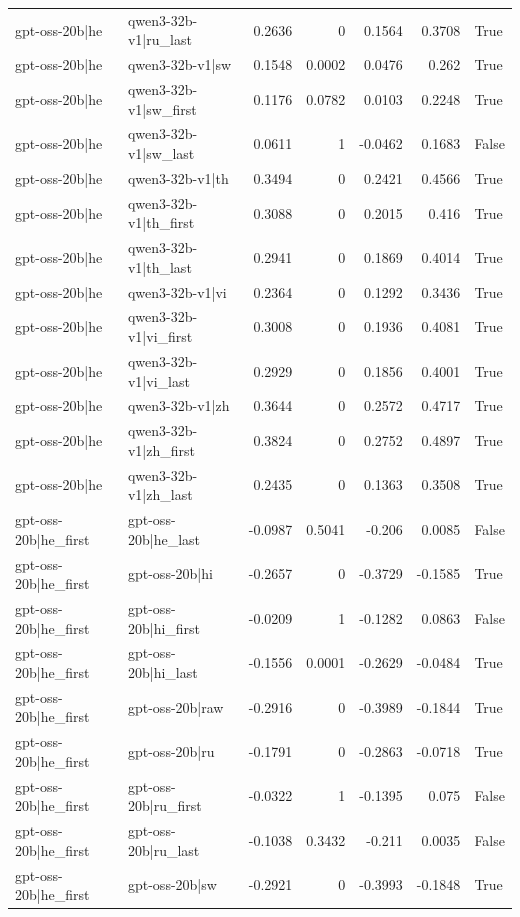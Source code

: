 \begin{table}
\begin{tabular}{l l r r r r l}
gpt-oss-20b|he & qwen3-32b-v1|ru_last & 0.2636 & 0 & 0.1564 & 0.3708 & True \\
gpt-oss-20b|he & qwen3-32b-v1|sw & 0.1548 & 0.0002 & 0.0476 & 0.262 & True \\
gpt-oss-20b|he & qwen3-32b-v1|sw_first & 0.1176 & 0.0782 & 0.0103 & 0.2248 & True \\
gpt-oss-20b|he & qwen3-32b-v1|sw_last & 0.0611 & 1 & -0.0462 & 0.1683 & False \\
gpt-oss-20b|he & qwen3-32b-v1|th & 0.3494 & 0 & 0.2421 & 0.4566 & True \\
gpt-oss-20b|he & qwen3-32b-v1|th_first & 0.3088 & 0 & 0.2015 & 0.416 & True \\
gpt-oss-20b|he & qwen3-32b-v1|th_last & 0.2941 & 0 & 0.1869 & 0.4014 & True \\
gpt-oss-20b|he & qwen3-32b-v1|vi & 0.2364 & 0 & 0.1292 & 0.3436 & True \\
gpt-oss-20b|he & qwen3-32b-v1|vi_first & 0.3008 & 0 & 0.1936 & 0.4081 & True \\
gpt-oss-20b|he & qwen3-32b-v1|vi_last & 0.2929 & 0 & 0.1856 & 0.4001 & True \\
gpt-oss-20b|he & qwen3-32b-v1|zh & 0.3644 & 0 & 0.2572 & 0.4717 & True \\
gpt-oss-20b|he & qwen3-32b-v1|zh_first & 0.3824 & 0 & 0.2752 & 0.4897 & True \\
gpt-oss-20b|he & qwen3-32b-v1|zh_last & 0.2435 & 0 & 0.1363 & 0.3508 & True \\
gpt-oss-20b|he_first & gpt-oss-20b|he_last & -0.0987 & 0.5041 & -0.206 & 0.0085 & False \\
gpt-oss-20b|he_first & gpt-oss-20b|hi & -0.2657 & 0 & -0.3729 & -0.1585 & True \\
gpt-oss-20b|he_first & gpt-oss-20b|hi_first & -0.0209 & 1 & -0.1282 & 0.0863 & False \\
gpt-oss-20b|he_first & gpt-oss-20b|hi_last & -0.1556 & 0.0001 & -0.2629 & -0.0484 & True \\
gpt-oss-20b|he_first & gpt-oss-20b|raw & -0.2916 & 0 & -0.3989 & -0.1844 & True \\
gpt-oss-20b|he_first & gpt-oss-20b|ru & -0.1791 & 0 & -0.2863 & -0.0718 & True \\
gpt-oss-20b|he_first & gpt-oss-20b|ru_first & -0.0322 & 1 & -0.1395 & 0.075 & False \\
gpt-oss-20b|he_first & gpt-oss-20b|ru_last & -0.1038 & 0.3432 & -0.211 & 0.0035 & False \\
gpt-oss-20b|he_first & gpt-oss-20b|sw & -0.2921 & 0 & -0.3993 & -0.1848 & True \\

\end{tabular}
\end{table}

